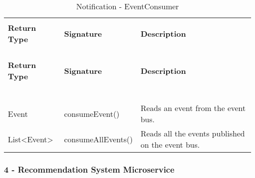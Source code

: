 \begin{longtable}{p{}p{}p{}}
    \caption{Notification - EventConsumer}
    \vspace{0.5em}\\
    \hline
    \vspace{0.5em}\\
    \textbf{Return Type} & \textbf{Signature} & \textbf{Description} \\
    \vspace{0.5em}\\
    \hline
    \vspace{0.5em}\\
    \endfirsthead
    \vspace{0.5em}\\
    \hline
    \vspace{0.5em}\\
    \textbf{Return Type} & \textbf{Signature} & \textbf{Description} \\
    \vspace{0.5em}\\
    \hline
    \vspace{0.5em}\\
    \endhead
    
    \vspace{0.5em}\\
    \hline
    \vspace{0.5em}\\
    \endfoot
    
    \vspace{0.5em}\\
    \hline
    \vspace{0.5em}\\
    \endlastfoot
    
    Event &
    consumeEvent() &
    Reads an event from the event bus.
    \vspace{0.5em}\\
    List<Event> &
    consumeAllEvents() &
    Reads all the events published on the event bus. \\

\end{longtable}

\subsubsection{4 - Recommendation System Microservice}

